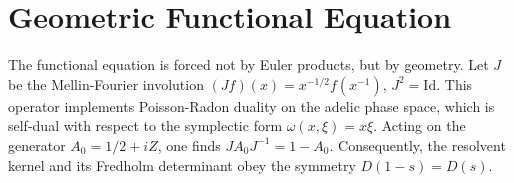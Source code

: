 \section{Geometric Functional Equation}
The functional equation is forced not by Euler products, but by geometry. Let $J$ be the Mellin-Fourier involution $(Jf)(x) = x^{-1/2}f(x^{-1})$, $J^2 = \mathrm{Id}$. This operator implements Poisson-Radon duality on the adelic phase space, which is self-dual with respect to the symplectic form $\omega(x,\xi) = x\xi$. Acting on the generator $A_0 = 1/2 + iZ$, one finds $JA_0J^{-1} = 1 - A_0$. Consequently, the resolvent kernel and its Fredholm determinant obey the symmetry $D(1-s) = D(s)$.
